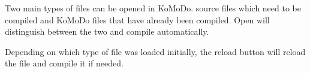 \graphicspath{ {images/files/} }

Two main types of files can be opened in KoMoDo.  source files which need to be compiled and  KoMoDo files that have already been compiled. Open will distinguish between the two and compile automatically.

Depending on which type of file was loaded initially, the reload button will reload the file and compile it if needed.

